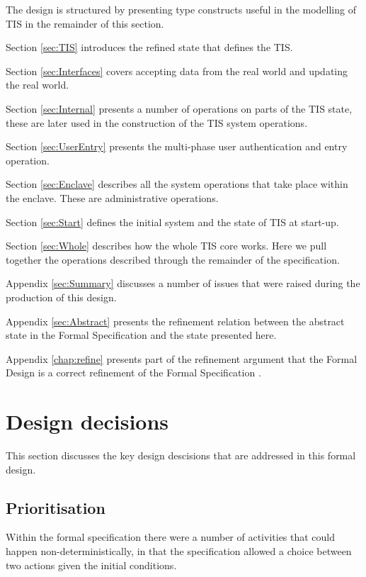 The design is structured by presenting type constructs useful in the
modelling of TIS in the remainder of this section. 

Section \ref{sec:TIS} introduces the refined state that defines the TIS.
  
Section \ref{sec:Interfaces} covers accepting data
from the real world and updating the real world. 

Section \ref{sec:Internal} presents a number of operations on parts of
the TIS state, these are later used in the construction of the TIS
system operations. 

Section \ref{sec:UserEntry} presents the multi-phase user authentication and
entry operation.

Section \ref{sec:Enclave} describes all the system operations that
take place within the enclave. These are administrative operations.

Section \ref{sec:Start} defines the initial system and the state of TIS at
start-up.

Section \ref{sec:Whole} describes how the whole TIS core
works. Here we pull together the operations described through the remainder
of the specification.
 
Appendix \ref{sec:Summary} discusses a number of issues that were raised during the
production of this design. 

Appendix \ref{sec:Abstract} presents the refinement relation between the abstract state in
the Formal Specification \cite{FS} and the state presented here.

Appendix \ref{chap:refine} presents part of the refinement argument
that the Formal Design is a correct refinement of the Formal
Specification \cite{FS}.

\section{Design decisions}
This section discusses the key design descisions that are addressed in
this formal design. 

\subsection{Prioritisation}
Within the formal specification there were a number of activities that
could happen non-deterministically, in that the specification allowed
a choice between two actions given the initial conditions.

